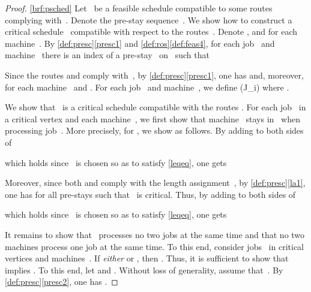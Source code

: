 \documentclass[natbib,sort,smallextended,envcountsame,envcountsect,numbook]{svjour3}
\newcommand{\ROSUPT}{\textsc{ROS-UET}}
\newcommand{\loc}{\text{loc}}
\begin{document}
\begin{proof}
  \eqref{brf:psched}
  Let ~be a feasible schedule compatible to
  some routes~
  complying with~.  Denote the pre-stay sequence~.
  We show how to construct a critical schedule~
  compatible with respect to the routes~.
  Denote ,
  and 
  for each machine~.
  By \cref{def:presc}\eqref{presc1} and \cref{def:ros}\eqref{def:feas4}, for each job~ and machine~ there is an index  of a pre-stay~ on~ such that
  
  Since the routes  and  comply with~, by \cref{def:presc}\eqref{presc1}, one has  and, moreover,  for each machine~ and .
For each job~ and machine~, we define
  \loc(J_i)
where .

We show that ~is a critical schedule compatible with the routes .
For each job~ in a critical vertex and each machine~,
we first show that machine~ stays in~ when processing job~.
More precisely, for  ,
we show  as follows.
By adding  to both sides of

which holds since ~is chosen so as to satisfy \eqref{leqeq}, one gets

 Moreover, since both  and  comply with the length assignment~, by \cref{def:presc}\eqref{la1}, one has  for all pre-stays  such that ~is critical. Thus, by adding  to both sides of

which holds since ~is chosen so as to satisfy \eqref{leqeq}, one gets

It remains to show that~ processes no two jobs at the same time and that no two machines process one job at the same time.  To this end, consider jobs~ in critical vertices and machines~.  If \emph{either}  or , then .  Thus, it is sufficient to show that  implies .  
To this end, let  and .
Without loss of generality, assume that~.  
By \cref{def:presc}\eqref{presc2}, one has . 


\end{proof}
\end{document}
